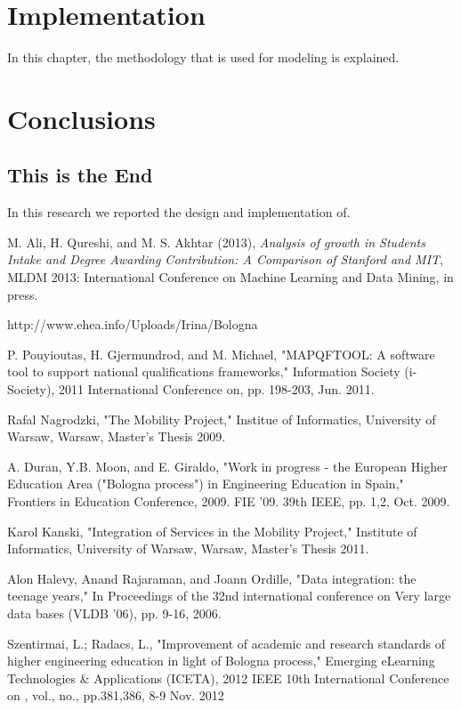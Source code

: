 \documentclass[12pt,a4paper,oneside]{book}
\begin{document}

\chapter{Implementation}\label{ch-implement}
In this chapter, the methodology that is used for modeling is explained.


\chapter{Conclusions}
\label{ch:Conclusions}

\section{This is the End}
\label{sec:This_is_the_end}
%
In this research we reported the design and implementation of.




\begin{thebibliography}{10}

M. Ali, H. Qureshi, and M. S. Akhtar (2013), \emph{Analysis of growth in Students Intake and Degree Awarding Contribution: A Comparison of Stanford and MIT}, MLDM 2013: International Conference on Machine Learning and Data Mining, in press.

http://www.ehea.info/Uploads/Irina/Bologna%

P. Pouyioutas, H. Gjermundrod, and M. Michael, "MAPQFTOOL: A software tool to support national qualifications frameworks," Information Society (i-Society), 2011 International Conference on, pp. 198-203, Jun. 2011.

Rafal Nagrodzki, "The Mobility Project," Institue of Informatics, University of Warsaw, Warsaw, Master's Thesis 2009.

A. Duran, Y.B. Moon, and E. Giraldo, "Work in progress - the European Higher Education Area ("Bologna process") in Engineering Education in Spain," Frontiers in Education Conference, 2009. FIE '09. 39th IEEE, pp. 1,2, Oct. 2009.

Karol Kanski, "Integration of Services in the Mobility Project," Institute of Informatics, University of Warsaw, Warsaw, Master's Thesis 2011.

Alon Halevy, Anand Rajaraman, and Joann Ordille, "Data integration: the teenage years," In Proceedings of the 32nd international conference on Very large data bases (VLDB '06), pp. 9-16, 2006.

Szentirmai, L.; Radacs, L., "Improvement of academic and research standards of higher engineering education in light of Bologna process," Emerging eLearning Technologies \& Applications (ICETA), 2012 IEEE 10th International Conference on , vol., no., pp.381,386, 8-9 Nov. 2012

\end{thebibliography}
\end{document}
